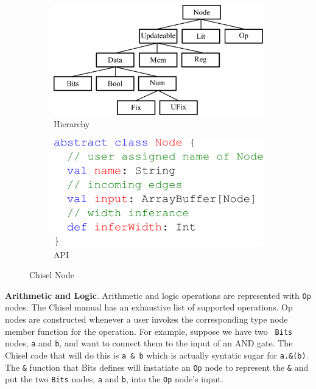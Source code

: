 \begin{figure}[hb]
\centering
  \begin{subfigure}[t]{0.48\textwidth}
  \includegraphics[width=\textwidth]{figures/hierarchy.pdf}
  \caption{Hierarchy}
  \label{fig:hier}
  \end{subfigure}
  \hfill
  \begin{subfigure}[t]{0.48\textwidth}
  \includegraphics[width=\textwidth]{figures/node.pdf}
  \caption{API}
  \label{fig:nodeapi}
  \end{subfigure}
  \hfill
  \caption{Chisel Node}
  \label{fig:node}
\end{figure}

{\bf Arithmetic and Logic}. Arithmetic and logic operations
are represented with {\tt Op} nodes. The Chisel manual has an
exhaustive list of supported operations. Op nodes are constructed
whenever a user invokes the corresponding type node member
function for the operation. For example, suppose we have two {\tt
Bits} nodes, {\tt a} and {\tt b}, and want to connect them to the
input of an AND gate. The Chisel code that will do this is {\tt a \&
b} which is actually syntatic sugar for {\tt a.\&(b)}. The {\tt \&}
function that Bits defines will instatiate an {\tt Op} node to
represent the {\tt \&} and put the two {\tt Bits} nodes, {\tt a} and
{\tt b}, into the {\tt Op} node's input.

